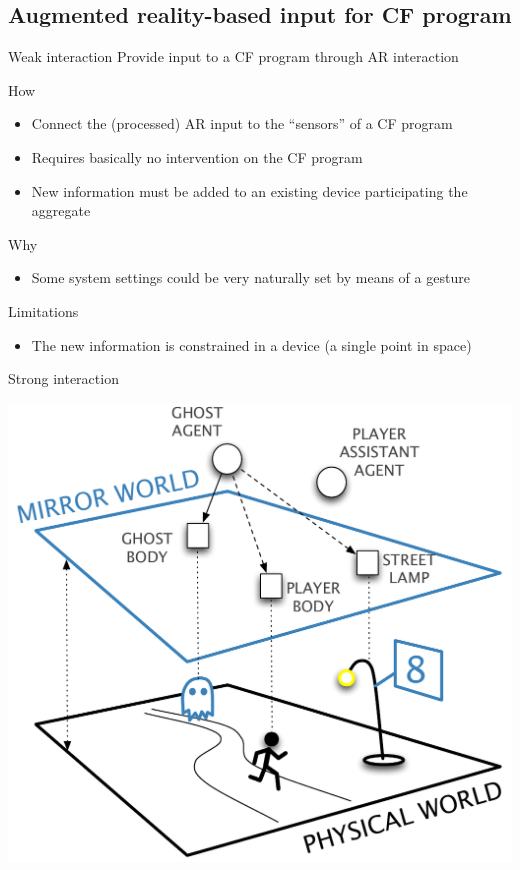 \documentclass[presentation]{beamer} %
\begin{document}
\subsection{Augmented reality-based input for CF program}
\begin{frame}{Weak interaction}
  Provide input to a CF program through AR interaction
  \begin{block} {How}
   \begin{itemize}
    \item Connect the (processed) AR input to the ``sensors'' of a CF program
    \item Requires basically no intervention on the CF program
    \item New information must be added to an existing device participating the aggregate
   \end{itemize}
  \end{block}
  \begin{block} {Why}
   \begin{itemize}
    \item Some system settings could be very naturally set by means of a gesture
   \end{itemize}
  \end{block}
  \begin{block} {Limitations}
   \begin{itemize}
    \item The new information is constrained in a device (a single point in space)
   \end{itemize}
  \end{block}
\end{frame}

\begin{frame}{Strong interaction}
  \begin{center}
    \includegraphics[width=.6\textwidth]{images/game2}
  \end{center}
\end{frame}
\end{document}
